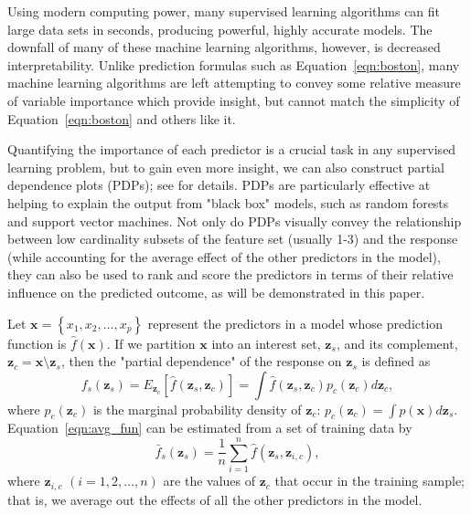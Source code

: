 \documentclass[12pt]{article}
\begin{document}
Using modern computing power, many supervised learning algorithms can fit large data sets in seconds, producing powerful, highly accurate models. The downfall of many of these machine learning algorithms, however, is decreased interpretability. Unlike prediction formulas such as Equation~\eqref{eqn:boston}, many machine learning algorithms are left attempting to convey some relative measure of variable importance which provide insight, but cannot match the simplicity of Equation~\eqref{eqn:boston} and others like it.

Quantifying the importance of each predictor is a crucial task in any supervised learning problem, but to gain even more insight, we can also construct partial dependence plots (PDPs); see \citet{friedman-2001-greedy} for details. PDPs are particularly effective at helping to explain the output from "black box" models, such as random forests and support vector machines. Not only do PDPs visually convey the relationship between low cardinality subsets of the feature set (usually 1-3) and the response (while accounting for the average effect of the other predictors in the model), they can also be used to rank and score the predictors in terms of their relative influence on the predicted outcome, as will be demonstrated in this paper. 

Let $\boldsymbol{x} = \left\{x_1, x_2, \dots, x_p\right\}$ represent the predictors in a model whose prediction function is $\widehat{f}\left(\boldsymbol{x}\right)$. If we partition $\boldsymbol{x}$ into an interest set, $\boldsymbol{z}_s$, and its complement, $\boldsymbol{z}_c = \boldsymbol{x} \setminus \boldsymbol{z}_s$, then the "partial dependence" of the response on $\boldsymbol{z}_s$ is defined as
\begin{equation}
\label{eqn:avg_fun}
  f_s\left(\boldsymbol{z}_s\right) = E_{\boldsymbol{z}_c}\left[\widehat{f}\left(\boldsymbol{z}_s, \boldsymbol{z}_c\right)\right] = \int \widehat{f}\left(\boldsymbol{z}_s, \boldsymbol{z}_c\right)p_{c}\left(\boldsymbol{z}_c\right)d\boldsymbol{z}_c,
\end{equation}
where $p_{c}\left(\boldsymbol{z}_c\right)$ is the marginal probability density of $\boldsymbol{z}_c$: $p_{c}\left(\boldsymbol{z}_c\right) = \int p\left(\boldsymbol{x}\right)d\boldsymbol{z}_s$.
Equation~\eqref{eqn:avg_fun} can be estimated from a set of training data by
\begin{equation}
\label{eqn:pdf}
\bar{f}_s\left(\boldsymbol{z}_s\right) = \frac{1}{n}\sum_{i = 1}^n\widehat{f}\left(\boldsymbol{z}_s,\boldsymbol{z}_{i, c}\right),
\end{equation}
where $\boldsymbol{z}_{i, c}$ $\left(i = 1, 2, \dots, n\right)$ are the values of $\boldsymbol{z}_c$ that occur in the training sample; that is, we average out the effects of all the other predictors in the model.
\end{document}
